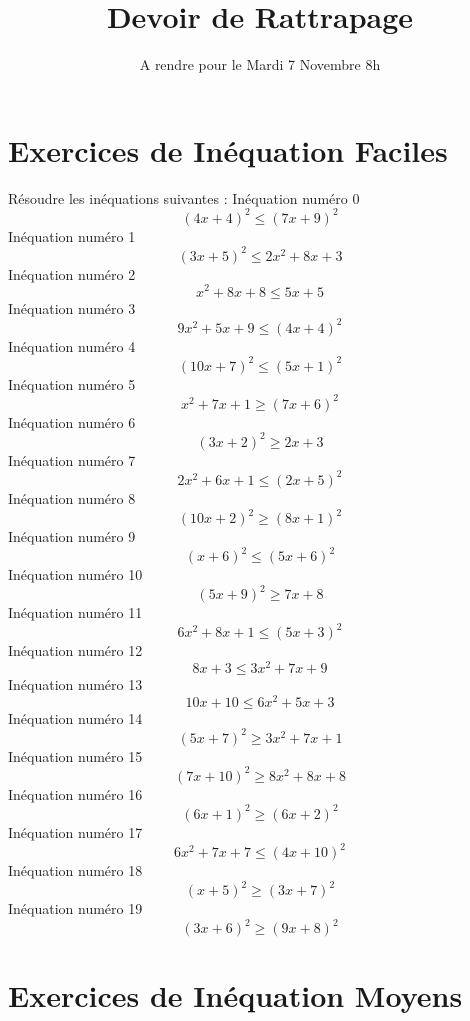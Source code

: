 \documentclass{article}
\title{Devoir de Rattrapage}
\date{A rendre pour le Mardi 7 Novembre 8h}\usepackage{natbib}
\begin{document}
\maketitle
 \section{Exercices de In\'equation Faciles}

 R\'esoudre les in\'equations suivantes : 
In\'equation num\'ero 0 \[\left(4 x + 4\right)^{2} \leq \left(7 x + 9\right)^{2}\]In\'equation num\'ero 1 \[\left(3 x + 5\right)^{2} \leq 2 x^{2} + 8 x + 3\]In\'equation num\'ero 2 \[x^{2} + 8 x + 8 \leq 5 x + 5\]In\'equation num\'ero 3 \[9 x^{2} + 5 x + 9 \leq \left(4 x + 4\right)^{2}\]In\'equation num\'ero 4 \[\left(10 x + 7\right)^{2} \leq \left(5 x + 1\right)^{2}\]In\'equation num\'ero 5 \[x^{2} + 7 x + 1 \geq \left(7 x + 6\right)^{2}\]In\'equation num\'ero 6 \[\left(3 x + 2\right)^{2} \geq 2 x + 3\]In\'equation num\'ero 7 \[2 x^{2} + 6 x + 1 \leq \left(2 x + 5\right)^{2}\]In\'equation num\'ero 8 \[\left(10 x + 2\right)^{2} \geq \left(8 x + 1\right)^{2}\]In\'equation num\'ero 9 \[\left(x + 6\right)^{2} \leq \left(5 x + 6\right)^{2}\]In\'equation num\'ero 10 \[\left(5 x + 9\right)^{2} \geq 7 x + 8\]In\'equation num\'ero 11 \[6 x^{2} + 8 x + 1 \leq \left(5 x + 3\right)^{2}\]In\'equation num\'ero 12 \[8 x + 3 \leq 3 x^{2} + 7 x + 9\]In\'equation num\'ero 13 \[10 x + 10 \leq 6 x^{2} + 5 x + 3\]In\'equation num\'ero 14 \[\left(5 x + 7\right)^{2} \geq 3 x^{2} + 7 x + 1\]In\'equation num\'ero 15 \[\left(7 x + 10\right)^{2} \geq 8 x^{2} + 8 x + 8\]In\'equation num\'ero 16 \[\left(6 x + 1\right)^{2} \geq \left(6 x + 2\right)^{2}\]In\'equation num\'ero 17 \[6 x^{2} + 7 x + 7 \leq \left(4 x + 10\right)^{2}\]In\'equation num\'ero 18 \[\left(x + 5\right)^{2} \geq \left(3 x + 7\right)^{2}\]In\'equation num\'ero 19 \[\left(3 x + 6\right)^{2} \geq \left(9 x + 8\right)^{2}\]
 \section{Exercices de In\'equation Moyens}
\end{document}
